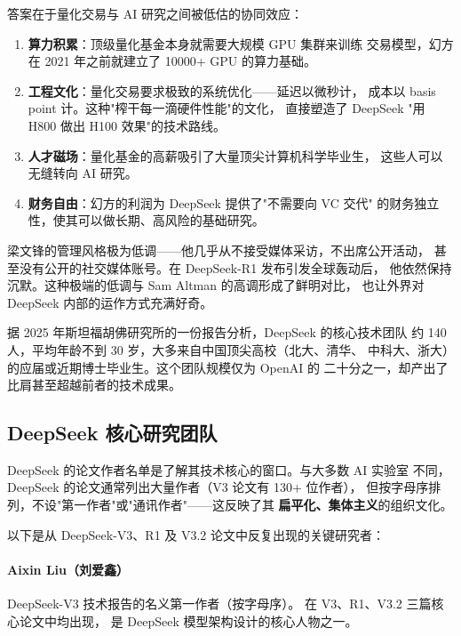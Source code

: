 \begin{whybox}[为什么一个量化基金经理能做出世界级 AI？]
答案在于量化交易与 AI 研究之间被低估的协同效应：
\begin{enumerate}[noitemsep]
  \item \textbf{算力积累}：顶级量化基金本身就需要大规模 GPU 集群来训练
        交易模型，幻方在 2021 年之前就建立了 10000+ GPU 的算力基础。
  \item \textbf{工程文化}：量化交易要求极致的系统优化——延迟以微秒计，
        成本以 basis point 计。这种"榨干每一滴硬件性能"的文化，
        直接塑造了 DeepSeek "用 H800 做出 H100 效果"的技术路线。
  \item \textbf{人才磁场}：量化基金的高薪吸引了大量顶尖计算机科学毕业生，
        这些人可以无缝转向 AI 研究。
  \item \textbf{财务自由}：幻方的利润为 DeepSeek 提供了"不需要向 VC 交代"
        的财务独立性，使其可以做长期、高风险的基础研究。
\end{enumerate}
\end{whybox}

梁文锋的管理风格极为低调——他几乎从不接受媒体采访，不出席公开活动，
甚至没有公开的社交媒体账号。在 DeepSeek-R1 发布引发全球轰动后，
他依然保持沉默。这种极端的低调与 Sam Altman 的高调形成了鲜明对比，
也让外界对 DeepSeek 内部的运作方式充满好奇。

据 2025 年斯坦福胡佛研究所的一份报告分析，DeepSeek 的核心技术团队
约 140 人，平均年龄不到 30 岁，大多来自中国顶尖高校（北大、清华、
中科大、浙大）的应届或近期博士毕业生。这个团队规模仅为 OpenAI 的
二十分之一，却产出了比肩甚至超越前者的技术成果。

\subsection{DeepSeek 核心研究团队}

DeepSeek 的论文作者名单是了解其技术核心的窗口。与大多数 AI 实验室
不同，DeepSeek 的论文通常列出大量作者（V3 论文有 130+ 位作者），
但按字母序排列，不设"第一作者"或"通讯作者"——这反映了其
\textbf{扁平化、集体主义}的组织文化。

以下是从 DeepSeek-V3、R1 及 V3.2 论文中反复出现的关键研究者：

\paragraph{Aixin Liu（刘爱鑫）}
DeepSeek-V3 技术报告的名义第一作者（按字母序）。
在 V3、R1、V3.2 三篇核心论文中均出现，
是 DeepSeek 模型架构设计的核心人物之一。

